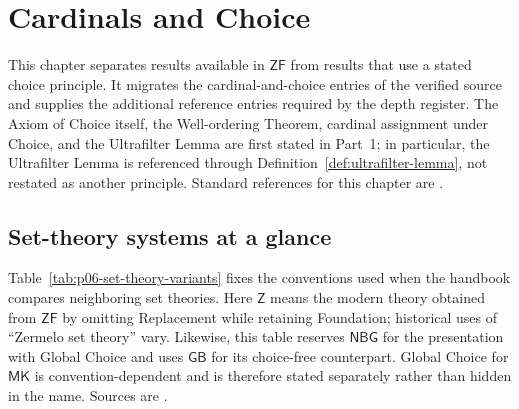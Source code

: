 
\chapter{Cardinals and Choice}
\label{sec:p06-cardinals-choice}

This chapter separates results available in \(\mathsf{ZF}\) from results
that use a stated choice principle.  It migrates the cardinal-and-choice
entries of the verified source and supplies the additional reference entries
required by the depth register.  The Axiom of Choice itself, the Well-ordering
Theorem, cardinal assignment under Choice, and the Ultrafilter Lemma are first
stated in Part~1; in particular, the Ultrafilter Lemma is referenced through
Definition~\ref{def:ultrafilter-lemma}, not restated as another principle.
Standard references for this chapter are
\cite{Jech2003,Jech1973Choice,HowardRubin1998,Kunen2011}.

\section{Set-theory systems at a glance}

Table~\ref{tab:p06-set-theory-variants} fixes the conventions used when the
handbook compares neighboring set theories.  Here \(\mathsf Z\) means the
modern theory obtained from \(\mathsf{ZF}\) by omitting Replacement while
retaining Foundation; historical uses of ``Zermelo set theory'' vary.
Likewise, this table reserves \(\mathsf{NBG}\) for the presentation with
Global Choice and uses \(\mathsf{GB}\) for its choice-free counterpart.
Global Choice for \(\mathsf{MK}\) is convention-dependent and is therefore
stated separately rather than hidden in the name.  Sources are
\cite{Jech2003,Barwise1975,Mendelson1997,Kelley1975,Quine1937,Specker1953,
Wilshaw2025ConNF}.

